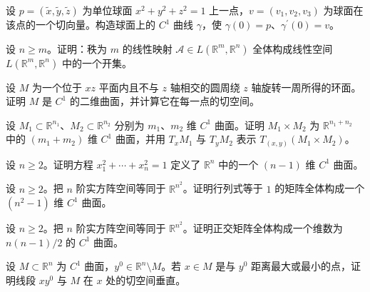 \noindent\begin{minipage}{\textwidth}
设 $p=(\widetilde x,\widetilde y,\widetilde z)$ 为单位球面 $x^2+y^2+z^2=1$ 上一点，$v=(v_1,v_2,v_3)$ 为球面在该点的一个切向量。构造球面上的 $C^1$ 曲线 $\gamma$，使 $\gamma(0)=p$、$\gamma^{\prime}(0)=v$。
\end{minipage}\par\vfill
\newpage
\noindent\begin{minipage}{\textwidth}
设 $n\ge m$。证明：秩为 $m$ 的线性映射 $\mathcal A\in L(\mathbb R^m,\mathbb R^n)$ 全体构成线性空间 $L(\mathbb R^m,\mathbb R^n)$ 中的一个开集。
\end{minipage}\par\vfill
\noindent\begin{minipage}{\textwidth}
设 $M$ 为一个位于 $xz$ 平面内且不与 $z$ 轴相交的圆周绕 $z$ 轴旋转一周所得的环面。证明 $M$ 是 $C^1$ 的二维曲面，并计算它在每一点的切空间。
\end{minipage}\par\vfill
\noindent\begin{minipage}{\textwidth}
设 $M_1\subset\mathbb R^{n_1}$、$M_2\subset\mathbb R^{n_2}$ 分别为 $m_1$、$m_2$ 维 $C^1$ 曲面。证明 $M_1\times M_2$ 为 $\mathbb R^{n_1+n_2}$ 中的 $(m_1+m_2)$ 维 $C^1$ 曲面，并用 $T_xM_1$ 与 $T_yM_2$ 表示 $T_{(x,y)}(M_1\times M_2)$。
\end{minipage}\par\vfill
\noindent\begin{minipage}{\textwidth}
设 $n\ge2$。证明方程 $x_1^2+\cdots+x_n^2=1$ 定义了 $\mathbb R^n$ 中的一个 $(n-1)$ 维 $C^1$ 曲面。
\end{minipage}\par\vfill
\newpage
\noindent\begin{minipage}{\textwidth}
设 $n\ge2$。把 $n$ 阶实方阵空间等同于 $\mathbb R^{n^2}$。证明行列式等于 $1$ 的矩阵全体构成一个 $(n^2-1)$ 维 $C^1$ 曲面。
\end{minipage}\par\vfill
\noindent\begin{minipage}{\textwidth}
设 $n\ge2$。把 $n$ 阶实方阵空间等同于 $\mathbb R^{n^2}$。证明正交矩阵全体构成一个维数为 $n(n-1)/2$ 的 $C^1$ 曲面。
\end{minipage}\par\vfill
\noindent\begin{minipage}{\textwidth}
设 $M\subset\mathbb R^n$ 为 $C^1$ 曲面，$y^0\in\mathbb R^n\setminus M$。若 $x\in M$ 是与 $y^0$ 距离最大或最小的点，证明线段 $xy^0$ 与 $M$ 在 $x$ 处的切空间垂直。
\end{minipage}\par\vfill
